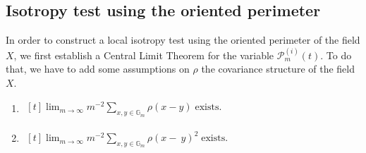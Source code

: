 \documentclass[12pt]{article}
\theoremstyle{Theorem}
\theoremstyle{definition}
\newcounter{Ax}
\newcommand{\itemA}{%
    \addtocounter{Ax}{1}
    \item[\textbf{A}\theAx.]}
\begin{document}
\subsection{Isotropy test using the oriented perimeter}
\label{isotest}
In order to construct a local isotropy test using the oriented perimeter of the field $X$, we first  establish a Central Limit Theorem for the variable $\mathcal{P}^{\scriptscriptstyle (i)}_{m}(t)$. To do that, we have to add some assumptions on $\rho$ the covariance structure of the field $X$.
\begin{enumerate}
 \itemA
 $\begin{aligned}[t]
 \label{conditionTCL1}
\lim_{m \to \infty} m^{-2}\sum_{x, y \in \mathbb{G}_{m}}\rho(x-y)\; \text{exists}.
\end{aligned}$
\itemA $\begin{aligned}[t]
 \lim_{m \to \infty} m^{-2}\sum_{x, y \in \mathbb{G}_{m}}\rho(x-~y)^{2}\; \text{exists}.
\end{aligned}$
\end{enumerate} 
\end{document}
